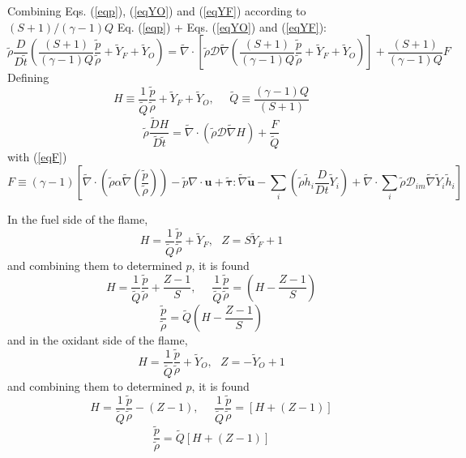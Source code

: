 \documentclass[preprint,12pt,authoryear]{elsarticle}
\begin{document}
{{\color{red}
Combining Eqs. (\ref{eqp}), (\ref{eqYO}) and (\ref{eqYF}) according to $(S+1)/(\gamma -1)Q$ Eq. (\ref{eqp}) + Eqs. (\ref{eqYO}) and (\ref{eqYF}):
%
\begin{equation}
	\tilde{\rho} \frac{D  }{D \tilde{t}}
	\left(
	\frac{(S+1)}{(\gamma-1)Q} \frac{ \tilde{p}}{ \tilde{\rho}} 
	+ \tilde{Y}_F + \tilde{Y}_O
	\right)
= 
	\tilde{\nabla}\cdot \left[ \tilde{\rho} \mathcal{D}
	\tilde{\nabla}
	\left(
	\frac{(S+1)}{(\gamma-1)Q} \frac{ \tilde{p}}{ \tilde{\rho}} 
	+ \tilde{Y}_F + \tilde{Y}_O
	\right)
	\right]
	+
	\frac{(S+1)}{(\gamma-1)Q} F
\end{equation}
Defining
\[
  H \equiv 
    \frac{1}{\tilde{Q}} 
    \frac{ \tilde{p}}{ \tilde{\rho}} + \tilde{Y}_F + \tilde{Y}_O,
    \ \ \ \ \ \ 
    \tilde{Q} \equiv 	\frac{(\gamma-1)Q}{(S+1)}
\]
\begin{equation}
	\tilde{\rho} \frac{\tilde{D}  H}{\tilde{D} \tilde{t}}
= 
	\tilde{\nabla}\cdot 
	\left( \tilde{\rho} \mathcal{D} \tilde{\nabla} H \right)
	+
	\frac{F}{\tilde{Q}}
\end{equation}
with (\ref{eqF})
\[
    F \equiv 
            (\gamma - 1)
        \left[
        \tilde{\nabla} \cdot 
		\left( 
		\tilde{\rho} \alpha
		\tilde{\nabla} (\frac{ \tilde{p} }{  \tilde{\rho} } )
		\right)
        -
        \tilde{p}  \nabla \cdot \mathbf{u}
		 +
        \pmb{\tilde{\tau}}:\tilde{\nabla} \pmb{\tilde{u}} 
        -
        \sum\limits_i
        \left(
                 \tilde{\rho}\tilde{h}_i
                \frac{D}{Dt}
		\tilde{Y}_i
		\right)
        +
        \tilde{\nabla} \cdot
        \sum\limits_i 
        \tilde{\rho}\mathcal{D}_{im}\tilde{\nabla}\tilde{Y}_i     
        \tilde{h}_i
        \right]
\]
}

{\color{blue}
In the fuel side of the flame, 
\[
     H
     =
     \frac{1}{\tilde{Q}} \frac{\tilde{p}}{\tilde{\rho}} + \tilde{Y}_F
     , \ \ \ 
     Z = S \tilde{Y}_F + 1
\]
and  combining them to determined $p$, it is found
\[
    H = \frac{1}{\tilde{Q}} \frac{\tilde{p}}{\tilde{\rho}}
    + 
    \frac{Z - 1}{S}, 
    \ \ \ \ \ \ 
    \frac{1}{\tilde{Q}} \frac{\tilde{p}}{\tilde{\rho}}
    =
    \left( H - \frac{Z-1}{S} \right)
\]
\begin{equation}
    \frac{\tilde{p}}{\tilde{\rho}}
    =
    \tilde{Q}
    \left( H - \frac{Z-1}{S} \right)
\label{eq0-15}
\end{equation}
and  in the oxidant side of the flame,
\[
     H
     =
     \frac{1}{\tilde{Q}} \frac{\tilde{p}}{\tilde{\rho}} + \tilde{Y}_O
     , \ \ \ 
     Z = - \tilde{Y}_O + 1
\]
and  combining them to determined $p$, it is found
\[
    H = \frac{1}{\tilde{Q}} \frac{\tilde{p}}{\tilde{\rho}}
    -
    (Z - 1), 
    \ \ \ \ \ \ 
    \frac{1}{\tilde{Q}} \frac{\tilde{p}}{\tilde{\rho}}
    =
    \left[ H + (Z-1) \right]
\]
\begin{equation}
    \frac{\tilde{p}}{\tilde{\rho}}
    =
    \tilde{Q}
    \left[ H + (Z-1) \right]
\label{eq0-16}
\end{equation}









}}
\end{document}
